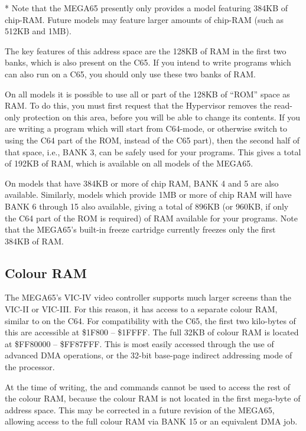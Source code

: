 * Note that the MEGA65 presently only provides a model featuring 384KB of chip-RAM. Future models may feature larger amounts of chip-RAM (such as 512KB and 1MB).

The key features of this address space are the 128KB of RAM in the first two banks, which is also present on
the C65. If you intend to write programs which can also run on a C65, you should only use these two banks
of RAM.

On all models it is possible to use all or part of the 128KB of ``ROM'' space as RAM. To do this, you must first
request that the Hypervisor removes the read-only protection on this area, before you will be able to change
its contents.  If you are writing a program which will start from C64-mode, or otherwise switch to using the C64
part of the ROM, instead of the C65 part), then the second half of that space, i.e., BANK 3, can be safely used
for your programs. This gives a total of 192KB of RAM, which is available on all models of the MEGA65.

On models that have 384KB or more of chip RAM, BANK 4 and 5 are also available.  Similarly, models which provide
1MB or more of chip RAM will have BANK 6 through 15 also available, giving a total of 896KB (or 960KB, if only
the C64 part of the ROM is required) of RAM available for your programs.  Note that the MEGA65's built-in
freeze cartridge currently freezes only the first 384KB of RAM.

\subsection{Colour RAM}

The MEGA65's VIC-IV video controller supports much larger screens than the VIC-II or VIC-III. For this reason, it
has access to a separate colour RAM, similar to on the C64.  For compatibility with the C65, the first two kilo-bytes
of this are accessible at \$1F800 -- \$1FFFF.  The full 32KB of colour RAM is located at \$FF80000 -- \$FF87FFF.
This is most easily accessed through the use of advanced DMA operations, or the 32-bit base-page indirect addressing
mode of the processor.

At the time of writing, the  and  commands cannot be used to access the rest of the colour RAM, because the
colour RAM is not located in the first mega-byte of address space.  This may be corrected in a future revision of
the MEGA65, allowing access to the full colour RAM via BANK 15 or an equivalent DMA job.

